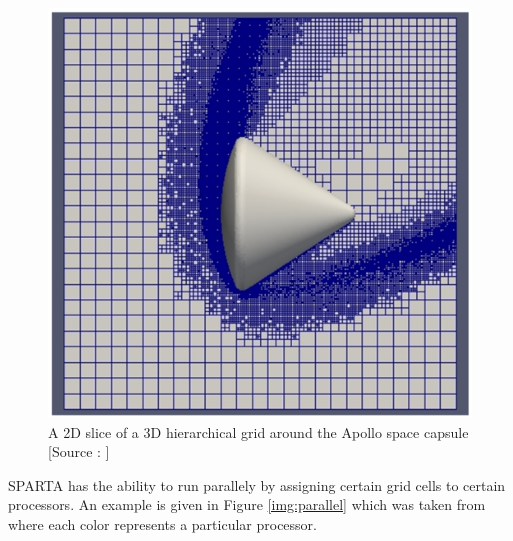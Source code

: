 \begin{figure}[H]
  \includegraphics[scale=0.5]{Pictures/Chapter_4_SPARTA/Grid.png}
  \centering
  \caption{A 2D slice of a 3D hierarchical grid around the Apollo space capsule [Source : \cite{plimpton2019direct}]}
  \label{img:grid}
\end{figure}

\no SPARTA has the ability to run parallely by assigning certain grid cells to certain processors. An example is given in Figure \ref{img:parallel} which was taken from \cite{plimpton2019direct} where each color represents a particular processor.

